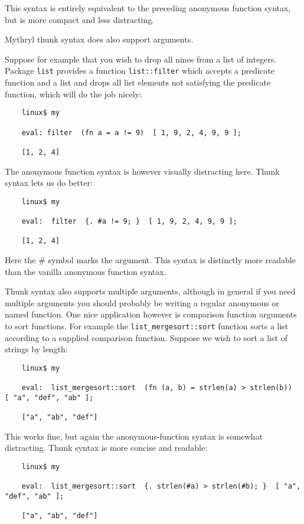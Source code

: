 This syntax is entirely equivalent to the preceding 
anonymous function syntax, but is more compact and 
less distracting.

Mythryl thunk syntax does also support arguments.

Suppose for example that you wish to drop all nines 
from a list of integers.  Package {\tt list} provides 
a function {\tt list::filter} which accepts a predicate 
function and a list and drops all list elements not 
satisfying the predicate function, which will do the 
job nicely:

\begin{verbatim}
    linux$ my

    eval: filter  (fn a = a != 9)  [ 1, 9, 2, 4, 9, 9 ];

    [1, 2, 4]
\end{verbatim}

The anonymous function syntax is however visually distracting 
here.  Thunk syntax lets us do better:

\begin{verbatim}
    linux$ my

    eval:  filter  {. #a != 9; }  [ 1, 9, 2, 4, 9, 9 ];

    [1, 2, 4]
\end{verbatim}

Here the \# symbol marks the argument.  This syntax is 
distinctly more readable than the vanilla anonymous function 
syntax.

Thunk syntax also supports multiple arguments, although in 
general if you need multiple arguments you should probably 
be writing a regular anonymous or named function.  One 
nice application however is comparison function arguments 
to sort functions.  For example the {\tt list\_mergesort::sort} 
function sorts a list according to a supplied comparison 
function.  Suppose we wish to sort a list of strings by length:

\begin{verbatim}
    linux$ my

    eval:  list_mergesort::sort  (fn (a, b) = strlen(a) > strlen(b))  [ "a", "def", "ab" ]; 

    ["a", "ab", "def"]
\end{verbatim}

This works fine, but again the anonymous-function syntax is 
somewhat distracting.  Thunk syntax is more concise and readable:

\begin{verbatim}
    linux$ my

    eval:  list_mergesort::sort  {. strlen(#a) > strlen(#b); }  [ "a", "def", "ab" ]; 

    ["a", "ab", "def"]
\end{verbatim}

